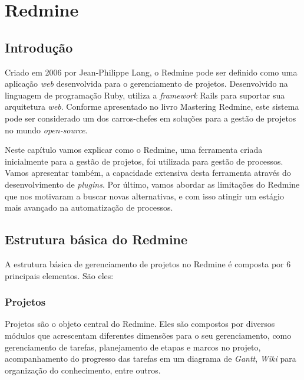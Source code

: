 \chapter{Redmine}\label{chp:redmine}

\section{Introdução}\label{sec:redmine-introducao}

Criado em 2006 por Jean-Philippe Lang, o Redmine\cite{redmine} pode ser definido como uma aplicação \textit{web} desenvolvida para o gerenciamento de projetos. Desenvolvido na linguagem de programação Ruby\cite{ruby-lang}, utiliza a \textit{framework} Rails\cite{rails} para suportar sua arquitetura \textit{web}. Conforme apresentado no livro Mastering Redmine\cite{mastering_redmine}, este sistema pode ser considerado um dos carros-chefes em soluções para a gestão de projetos no mundo \textit{open-source}.

Neste capítulo vamos explicar como o Redmine, uma ferramenta criada inicialmente para a gestão de projetos, foi utilizada para gestão de processos. Vamos apresentar também, a capacidade extensiva desta ferramenta através do desenvolvimento de \textit{plugins}. Por último, vamos abordar as limitações do Redmine que nos motivaram a buscar novas alternativas, e com isso atingir um estágio mais avançado na automatização de processos.

\section{Estrutura básica do Redmine}\label{sec:redmine-estrutura_basica}

A estrutura básica de gerenciamento de projetos no Redmine é composta por 6 principais elementos. São eles:

\subsection{Projetos}\label{subsection:redmine-estrutura_basica-projeto}

Projetos são o objeto central do Redmine. Eles são compostos por diversos módulos que acrescentam diferentes dimensões para o seu gerenciamento, como gerenciamento de tarefas, planejamento de etapas e marcos no projeto, acompanhamento do progresso das tarefas em um diagrama de \textit{Gantt}, \textit{Wiki} para organização do conhecimento, entre outros. 

